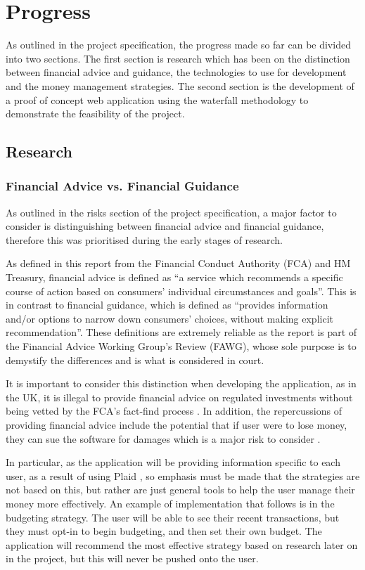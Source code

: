 \section{Progress} \label{sec:progress}

As outlined in the project specification, the progress made so far can be divided into two sections. The first section is research which has been on the distinction between financial advice and guidance, the technologies to use for development and the money management strategies. The second section is the development of a proof of concept web application using the waterfall methodology to demonstrate the feasibility of the project.

\subsection{Research}
\subsubsection{Financial Advice vs. Financial Guidance}

As outlined in the risks section of the project specification, a major factor to consider is distinguishing between financial advice and financial guidance, therefore this was prioritised during the early stages of research.

As defined in this report \cite{FCAReport} from the Financial Conduct Authority (FCA) and HM Treasury, financial advice is defined as ``a service which recommends a specific course of action based on consumers' individual circumstances and goals''. This is in contrast to financial guidance, which is defined as ``provides information and/or options to narrow down consumers' choices, without making explicit recommendation''. These definitions are extremely reliable as the report is part of the Financial Advice Working Group's Review (FAWG), whose sole purpose is to demystify the differences and is what is considered in court.

It is important to consider this distinction when developing the application, as in the UK, it is illegal to provide financial advice on regulated investments without being vetted by the FCA's fact-find process \cite{FinancialAdviceLegalities}. In addition, the repercussions of providing financial advice include the potential that if user were to lose money, they can sue the software for damages which is a major risk to consider \cite{SueBroker}. 

In particular, as the application will be providing information specific to each user, as a result of using Plaid \cite{Plaid}, so emphasis must be made that the strategies are not based on this, but rather are just general tools to help the user manage their money more effectively. An example of implementation that follows is in the budgeting strategy. The user will be able to see their recent transactions, but they must opt-in to begin budgeting, and then set their own budget. The application will recommend the most effective strategy based on research later on in the project, but this will never be pushed onto the user.